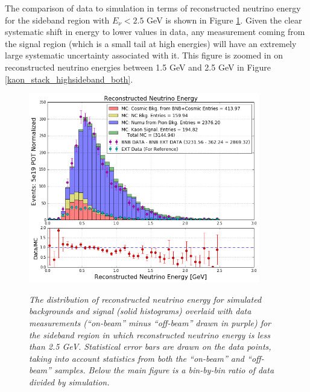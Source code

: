 The comparison of data to simulation in terms of reconstructed neutrino energy for the sideband region with $E_\nu < 2.5$ GeV is shown in Figure \ref{kaon_stack_sideband_both}. Given the clear systematic shift in energy to lower values in data, any measurement coming from the signal region (which is a small tail at high energies) will have an extremely large systematic uncertainty associated with it. This figure is zoomed in on reconstructed neutrino energies between 1.5 GeV and 2.5 GeV in Figure \ref{kaon_stack_highsideband_both}.\\

\begin{figure}[ht!]
\centering
	\includegraphics[width=0.9\textwidth]{Figures/kaon_both_sideband.png} \\
\caption{\textit{The distribution of reconstructed neutrino energy for simulated backgrounds and signal (solid histograms) overlaid with data measurements (``on-beam'' minus ``off-beam'' drawn in purple) for the sideband region in which reconstructed neutrino energy is less than 2.5 GeV. Statistical error bars are drawn on the data points, taking into account statistics from both the ``on-beam'' and ``off-beam'' samples. Below the main figure is a bin-by-bin ratio of data divided by simulation.}}\label{kaon_stack_sideband_both}
\end{figure}

